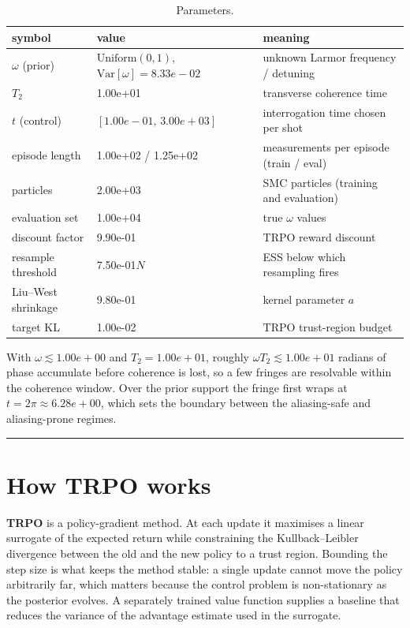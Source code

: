 \documentclass[12pt,a4paper]{article}
\begin{document}
\begin{table}[H]
  \centering
  \caption{Parameters.}
  \label{tab:parameters}
  \small
  \begin{tabular}{@{}>{\raggedright\arraybackslash}p{}
                    >{\raggedright\arraybackslash}p{}
                    >{\raggedright\arraybackslash}p{}@{}}
    \toprule
    symbol & value & meaning \\
    \midrule
    $\omega$ (prior) & $\mathrm{Uniform}(0, 1)$,
                       $\mathrm{Var}[\omega] = 8.33e-02$
                     & unknown Larmor frequency / detuning \\
    $T_2$ & 1.00e+01 & transverse coherence time \\
    $t$ (control) & $[1.00e-01,\, 3.00e+03]$ & interrogation time chosen per shot \\
    episode length & 1.00e+02 / 1.25e+02 & measurements per episode (train / eval) \\
    particles & 2.00e+03 & SMC particles (training and evaluation) \\
    evaluation set & 1.00e+04 & true $\omega$ values \\
    discount factor & 9.90e-01 & TRPO reward discount \\
    resample threshold & 7.50e-01$N$ & ESS below which resampling fires \\
    Liu--West shrinkage & 9.80e-01 & kernel parameter $a$ \\
    target KL & 1.00e-02 & TRPO trust-region budget \\
    \bottomrule
  \end{tabular}
\end{table}

\noindent With $\omega \lesssim 1.00e+00$ and $T_2 = 1.00e+01$, roughly
$\omega T_2 \lesssim 1.00e+01$ radians of phase accumulate before coherence
is lost, so a few fringes are resolvable within the coherence window. Over
the prior support the fringe first wraps at
$t = 2\pi \approx 6.28e+00$, which sets the boundary between the
aliasing-safe and aliasing-prone regimes.

\noindent\rule{\textwidth}{0.4pt}
\FloatBarrier

\section{How TRPO works}
\label{sec:trpo}
\textbf{TRPO} is a policy-gradient method. At each update it maximises a
linear surrogate of the expected return while constraining the
Kullback--Leibler divergence between the old and the new policy to a trust
region. Bounding the step size is what keeps the method stable: a single
update cannot move the policy arbitrarily far, which matters because the
control problem is non-stationary as the posterior evolves. A separately
trained value function supplies a baseline that reduces the variance of the
advantage estimate used in the surrogate.
\end{document}
